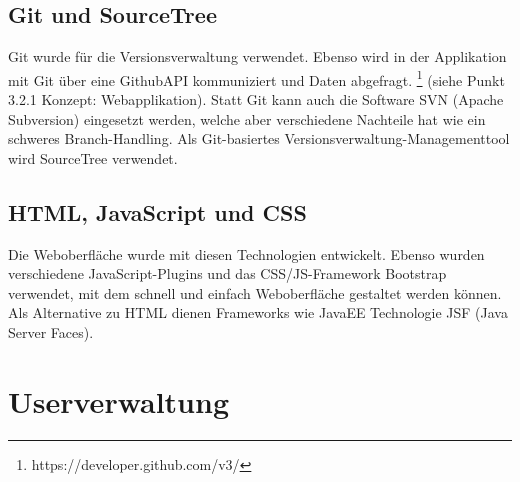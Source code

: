 \subsection{Git und SourceTree}
Git wurde für die Versionsverwaltung verwendet. Ebenso wird in der Applikation mit Git über eine GithubAPI kommuniziert und Daten abgefragt. \footnote{https://developer.github.com/v3/} (siehe Punkt 3.2.1 Konzept: Webapplikation). Statt Git kann auch die Software SVN (Apache Subversion) eingesetzt werden, welche aber verschiedene Nachteile hat wie ein schweres Branch-Handling. Als Git-basiertes Versionsverwaltung-Managementtool wird SourceTree verwendet.
\subsection{HTML, JavaScript und CSS}
Die Weboberfläche wurde mit diesen Technologien entwickelt. Ebenso wurden verschiedene JavaScript-Plugins und das CSS/JS-Framework Bootstrap verwendet, mit dem schnell und einfach Weboberfläche gestaltet werden können. Als Alternative zu HTML dienen Frameworks wie JavaEE Technologie JSF (Java Server Faces).
\section{Userverwaltung}
